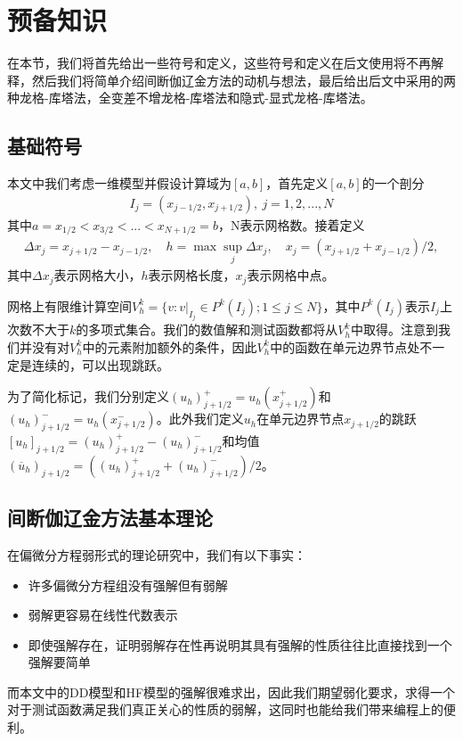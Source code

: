 \cleardoublepage

\section{预备知识}
在本节，我们将首先给出一些符号和定义，这些符号和定义在后文使用将不再解释，然后我们将简单介绍间断伽辽金方法的动机与想法，最后给出后文中采用的两种龙格-库塔法，全变差不增龙格-库塔法和隐式-显式龙格-库塔法。
\subsection{基础符号}
本文中我们考虑一维模型并假设计算域为$[a,b]$，首先定义$[a,b]$的一个剖分
\begin{align*}
    I_{j} = (x_{j-1/2}, x_{j+1/2}), \ j = 1, 2, ..., N
\end{align*}
其中$a=x_{1/2} < x_{3/2}< ...< x_{N+1/2}=b$，N表示网格数。接着定义
\begin{align*}
    \Delta x_j = x_{j+1/2}-x_{j-1/2}, \quad h = \max{\sup_j{\Delta x_j}}, \quad x_j = (x_{j+1/2}+x_{j-1/2})/{2},
\end{align*}
其中$\Delta x_j$表示网格大小，$h$表示网格长度，$x_j$表示网格中点。

网格上有限维计算空间$V_h^k = \{v:v|_{I_j}\in P^k(I_j); 1\leq j\leq N\}$，其中$P^k(I_j)$表示$I_j$上次数不大于$k$的多项式集合。我们的数值解和测试函数都将从$V_h^k$中取得。注意到我们并没有对$V^k_h$中的元素附加额外的条件，因此$V_h^k$中的函数在单元边界节点处不一定是连续的，可以出现跳跃。

为了简化标记，我们分别定义$(u_h)^+_{j+1/2}=u_h(x^+_{j+1/2})$和$(u_h)^-_{j+1/2}=u_h(x^-_{j+1/2})$。此外我们定义$u_h$在单元边界节点$x_{j+1/2}$的跳跃$[u_h]_{j+1/2}=(u_h)^+_{j+1/2}-(u_h)^-_{j+1/2}$和均值$(\overline{u}_h)_{j+1/2}=((u_h)_{j+1/2}^++(u_h)_{j+1/2}^-)/2$。

\subsection{间断伽辽金方法基本理论}

在偏微分方程弱形式的理论研究中，我们有以下事实\cite{sullivan2020brief}：
\begin{itemize}
    \item 许多偏微分方程组没有强解但有弱解
    \item 弱解更容易在线性代数表示
    \item 即使强解存在，证明弱解存在性再说明其具有强解的性质往往比直接找到一个强解要简单
\end{itemize}
而本文中的DD模型和HF模型的强解很难求出，因此我们期望弱化要求，求得一个对于测试函数满足我们真正关心的性质的弱解，这同时也能给我们带来编程上的便利。


